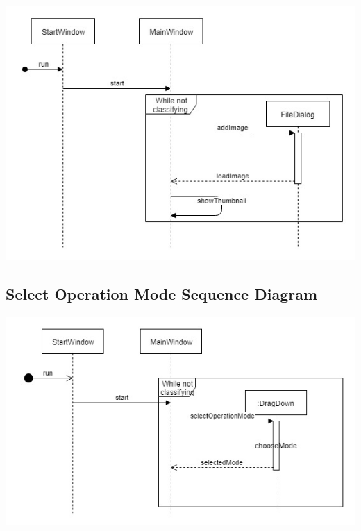 \documentclass[parskip=full]{scrartcl}
\begin{document}
\begin{center}
\includegraphics[angle=90,origin=c,height=1.0\textwidth]{SelectImageSeqDiag.jpg}
\end{center}

\pagebreak

\subsection {Select Operation Mode Sequence Diagram}

\begin{center}
\includegraphics[angle=90,origin=c,height=1.0\textwidth]{SelectOperationModeSequenceDiag.jpg}
\end{center}
\end{document}
